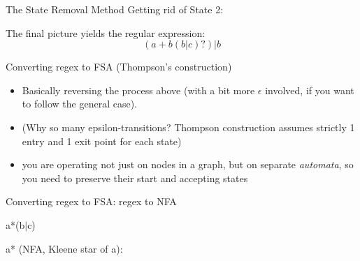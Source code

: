 \documentclass{beamer}
\def\dx{1cm} \def\dy{1.5cm}
\newcommand{\newState}[4]{\node[state,#3](#1)[#4]{#2};}
\newcommand{\newTransition}[4]{\path[->] (#1) edge [#4] node {#3} (#2);}
\begin{document}
\begin{frame}[allowframebreaks]{The State Removal Method}
  Getting rid of State 2:
  

  The final picture yields the regular expression:
  \[
    (a+b(b \vert c)?) \vert b
  \]
\end{frame}


\begin{frame}{Converting regex to FSA (Thompson's construction)}
  \begin{itemize}
  \item Basically reversing the process above (with a bit more
    $\epsilon$ involved, if you want to follow the general case).
  
  \item (Why so many epsilon-transitions?  Thompson construction
    assumes strictly 1 entry and 1 exit point for each state)

  \item you are operating not just on nodes in a graph, but on
    separate {\it automata}, so you need to preserve their start and
    accepting states
\end{itemize}
\end{frame}


\begin{frame}[t]{Converting regex to FSA: regex to NFA}

a*(b$\vert$c)

\pause

a* (NFA, Kleene star of a):

\begin{center}
\end{center}
\end{frame}
\end{document}
